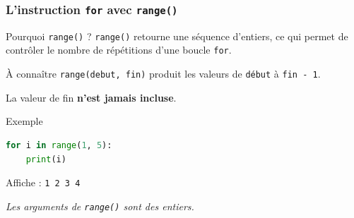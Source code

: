 \documentclass[10pt]{beamer}
\begin{document}
\begin{frame}[containsverbatim]
	\frametitle{L'instruction \texttt{for} avec \texttt{range()}}
	
	\begin{block}{Pourquoi \texttt{range()} ?}
		\texttt{range()}  retourne une séquence d'entiers, ce qui permet de 
		 contrôler le nombre de répétitions d'une boucle \texttt{for}.
	\end{block}
	
	\vspace{0.15cm}
	
	\begin{alertblock}{À connaître}
		\texttt{range(debut, fin)} produit les valeurs de \texttt{début}
		à \texttt{fin - 1}.
		
		\vspace{0.05cm}
		
		La valeur de fin \textbf{n'est jamais incluse}.
	\end{alertblock}
	
	\vspace{0.15cm}
	
\begin{exampleblock}{Exemple}
\begin{lstlisting}[language=Python]
for i in range(1, 5):
	print(i)
\end{lstlisting}
\centering
Affiche : \texttt{1  2  3  4}
\end{exampleblock}
	\centering
	\small
	\textit{Les arguments de \texttt{range()} sont des entiers.}
\end{frame}
\end{document}
